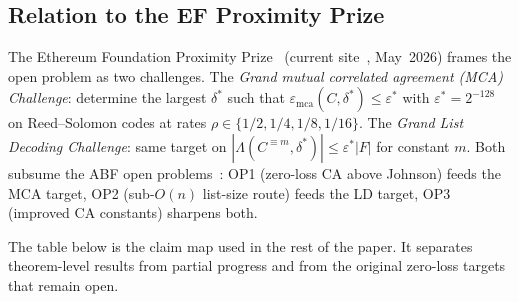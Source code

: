 \documentclass[11pt]{article}
\begin{document}
\subsection{Relation to the EF Proximity Prize}
\label{sec:abf}

The Ethereum Foundation Proximity Prize~\cite{EFPrize} (current site~\cite{EFPrizeSite}, May~2026) frames the open problem as two challenges. The \emph{Grand mutual correlated agreement (MCA) Challenge}: determine the largest $\delta^*$ such that $\varepsilon_{\mathrm{mca}}(C, \delta^*) \leq \varepsilon^*$ with $\varepsilon^* = 2^{-128}$ on Reed--Solomon codes at rates $\rho \in \{1/2, 1/4, 1/8, 1/16\}$. The \emph{Grand List Decoding Challenge}: same target on $|\Lambda(C^{\equiv m}, \delta^*)| \leq \varepsilon^* |F|$ for constant $m$. Both subsume the ABF open problems~\cite{ABF}: OP1 (zero-loss CA above Johnson) feeds the MCA target, OP2 (sub-$O(n)$ list-size route) feeds the LD target, OP3 (improved CA constants) sharpens both.

The table below is the claim map used in the rest of the paper. It separates theorem-level results from partial progress and from the original zero-loss targets that remain open.
\end{document}
